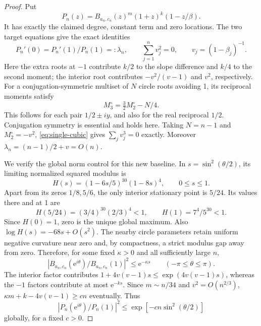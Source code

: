 \documentclass[11pt]{article}
\theoremstyle{remark}\newtheorem{remark}[theorem]{Remark}
\newcommand{\ee}{\mathrm e}
\begin{document}
\begin{proof}
Put
\[
 P_n(z)=B_{a_n,c_n}(z)^m(1+z)^k(1-z/\beta).
\]
It has exactly the claimed degree, constant term and zero locations.
The two target equations give the exact identities
\[
 P_n'(0)=P_n'(1)/P_n(1)=:\lambda_n,
 \qquad \sum_{j=1}^n v_j^2=0,
 \qquad v_j=(1-\beta_j)^{-1}.
\]
Here the extra roots at \(-1\) contribute \(k/2\) to the slope
difference and \(k/4\) to the second moment; the interior root
contributes \(-v^2/(v-1)\) and \(v^2\), respectively.
For a conjugation-symmetric multiset of \(N\) circle roots
avoiding 1, its reciprocal moments satisfy
\begin{equation}\label{eq:circle-third}
 M_3^{\circ}=\tfrac32 M_2^{\circ}-N/4.
\end{equation}
This follows for each pair \(1/2\pm iy\), and also for the real
reciprocal \(1/2\). Conjugation symmetry is essential and holds
here. Taking \(N=n-1\) and \(M_2^{\circ}=-v^2\),
\eqref{eq:single-cubic} gives \(\sum_jv_j^3=0\) exactly.
Moreover \(\lambda_n=(n-1)/2+v=O(n)\).

We verify the global norm control for this new baseline. In
\(s=\sin^2(\theta/2)\), its limiting normalized squared modulus is
\[
 H(s)=(1-6s/5)^{30}(1-8s)^4,\qquad 0\le s\le1.
\]
Apart from its zeros \(1/8,5/6\), the only interior stationary
point is \(5/24\). Its values there and at 1 are
\[
 H(5/24)=(3/4)^{30}(2/3)^4<1,\qquad H(1)=7^4/5^{30}<1.
\]
Since \(H(0)=1\), zero is the unique global maximum.
Also \(\log H(s)=-68s+O(s^2)\). The nearby circle parameters
retain uniform negative curvature near zero and, by compactness,
a strict modulus gap away from zero. Therefore, for some fixed
\(\kappa>0\) and all sufficiently large \(n\),
\[
 |B_{a_n,c_n}(\ee^{i\theta})/B_{a_n,c_n}(1)|^2
 \le \ee^{-\kappa s}\qquad(-\pi\le\theta\le\pi).
\]
The interior factor contributes
\(1+4v(v-1)s\le\exp(4v(v-1)s)\), whereas the \(-1\)
factors contribute at most \(\ee^{-ks}\). Since
\(m\sim n/34\) and \(v^2=O(n^{2/3})\),
\(\kappa m+k-4v(v-1)\ge c n\) eventually. Thus
\begin{equation}\label{eq:single-global}
 |P_n(\ee^{i\theta})/P_n(1)|^2
 \le\exp[-c n\sin^2(\theta/2)]
\end{equation}
globally, for a fixed \(c>0\).


\end{proof}
\end{document}
